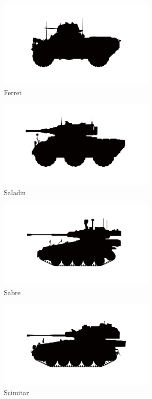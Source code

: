 \begin{figure}[h]
  \centering
  \includegraphics[width=0.7\textwidth]{platforms/ferret.pdf}
  \caption*{Ferret}
\end{figure}

\begin{figure}[h]
  \centering
  \includegraphics[width=0.7\textwidth]{platforms/saladin.pdf}
  \caption*{Saladin}
\end{figure}

\begin{figure}[h]
  \centering
  \includegraphics[width=0.7\textwidth]{platforms/sabre.pdf}
  \caption*{Sabre}
\end{figure}

\begin{figure}[h]
  \centering
  \includegraphics[width=0.7\textwidth]{platforms/scimitar.pdf}
  \caption*{Scimitar}
\end{figure}

